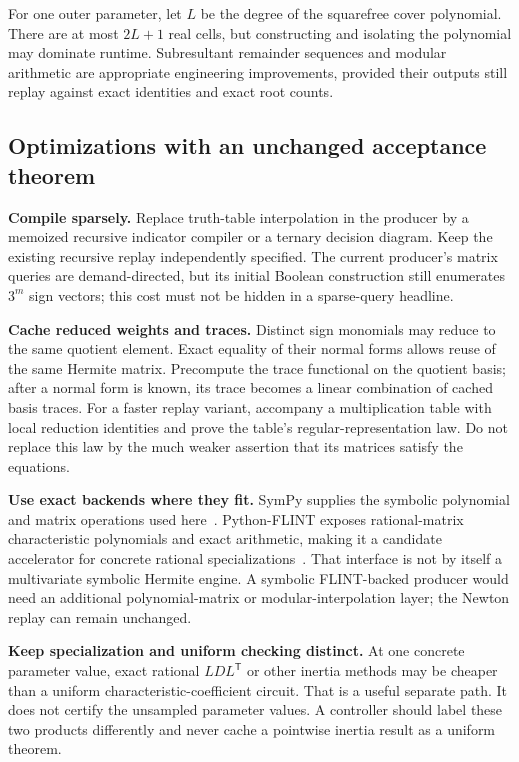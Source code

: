 For one outer parameter, let $L$ be the degree of the squarefree cover polynomial. There are at most $2L+1$ real cells, but constructing and isolating the polynomial may dominate runtime. Subresultant remainder sequences and modular arithmetic are appropriate engineering improvements, provided their outputs still replay against exact identities and exact root counts.

\subsection{Optimizations with an unchanged acceptance theorem}

\textbf{Compile sparsely.} Replace truth-table interpolation in the producer by a memoized recursive indicator compiler or a ternary decision diagram. Keep the existing recursive replay independently specified. The current producer's matrix queries are demand-directed, but its initial Boolean construction still enumerates $3^m$ sign vectors; this cost must not be hidden in a sparse-query headline.

\textbf{Cache reduced weights and traces.} Distinct sign monomials may reduce to the same quotient element. Exact equality of their normal forms allows reuse of the same Hermite matrix. Precompute the trace functional on the quotient basis; after a normal form is known, its trace becomes a linear combination of cached basis traces. For a faster replay variant, accompany a multiplication table with local reduction identities and prove the table's regular-representation law. Do not replace this law by the much weaker assertion that its matrices satisfy the equations.

\textbf{Use exact backends where they fit.} SymPy supplies the symbolic polynomial and matrix operations used here~\cite{sympy}. Python-FLINT exposes rational-matrix characteristic polynomials and exact arithmetic, making it a candidate accelerator for concrete rational specializations~\cite{python-flint}. That interface is not by itself a multivariate symbolic Hermite engine. A symbolic FLINT-backed producer would need an additional polynomial-matrix or modular-interpolation layer; the Newton replay can remain unchanged.

\textbf{Keep specialization and uniform checking distinct.} At one concrete parameter value, exact rational $LDL^{\mathsf T}$ or other inertia methods may be cheaper than a uniform characteristic-coefficient circuit. That is a useful separate path. It does not certify the unsampled parameter values. A controller should label these two products differently and never cache a pointwise inertia result as a uniform theorem.

